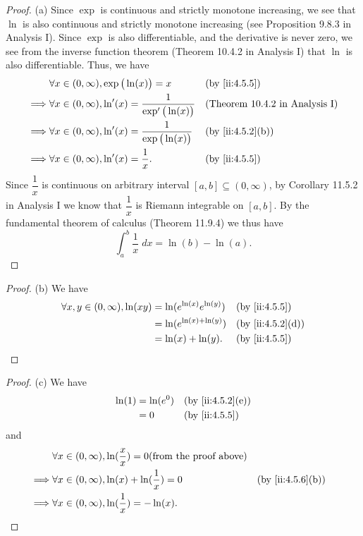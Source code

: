 \begin{proof}{(a)}
  Since \(\exp\) is continuous and strictly monotone increasing, we see that \(\ln\) is also continuous and strictly monotone increasing (see Proposition 9.8.3 in Analysis I).
  Since \(\exp\) is also differentiable, and the derivative is never zero, we see from the inverse function theorem (Theorem 10.4.2 in Analysis I) that \(\ln\) is also differentiable.
  Thus, we have
  \begin{align*}
             & \forall x \in (0, \infty), \exp\big(\ln(x)\big) = x                   &  & \by{ii:4.5.5}                         \\
    \implies & \forall x \in (0, \infty), \ln'(x) = \dfrac{1}{\exp'\big(\ln(x)\big)} &  & \text{(Theorem 10.4.2 in Analysis I)} \\
    \implies & \forall x \in (0, \infty), \ln'(x) = \dfrac{1}{\exp\big(\ln(x)\big)}  &  & \by{ii:4.5.2}[b]                      \\
    \implies & \forall x \in (0, \infty), \ln'(x) = \dfrac{1}{x}.                    &  & \by{ii:4.5.5}
  \end{align*}
  Since \(\dfrac{1}{x}\) is continuous on arbitrary interval \([a, b] \subseteq (0, \infty)\), by Corollary 11.5.2 in Analysis I we know that \(\dfrac{1}{x}\) is Riemann integrable on \([a, b]\).
  By the fundamental theorem of calculus (Theorem 11.9.4) we thus have
  \[
    \int_a^b \dfrac{1}{x} \; dx = \ln(b) - \ln(a).
  \]
\end{proof}

\begin{proof}{(b)}
  We have
  \begin{align*}
    \forall x, y \in (0, \infty), \ln(xy) & = \ln(e^{\ln(x)} e^{\ln(y)}) &  & \by{ii:4.5.5}    \\
                                          & = \ln(e^{\ln(x) + \ln(y)})   &  & \by{ii:4.5.2}[d] \\
                                          & = \ln(x) + \ln(y).           &  & \by{ii:4.5.5}
  \end{align*}
\end{proof}

\begin{proof}{(c)}
  We have
  \begin{align*}
    \ln(1) & = \ln(e^0) &  & \by{ii:4.5.2}[e] \\
           & = 0        &  & \by{ii:4.5.5}
  \end{align*}
  and
  \begin{align*}
             & \forall x \in (0, \infty), \ln(\dfrac{x}{x}) = 0 \text{(from the proof above)}                       \\
    \implies & \forall x \in (0, \infty), \ln(x) + \ln(\dfrac{1}{x}) = 0                      &  & \by{ii:4.5.6}[b] \\
    \implies & \forall x \in (0, \infty), \ln(\dfrac{1}{x}) = -\ln(x).
  \end{align*}
\end{proof}

